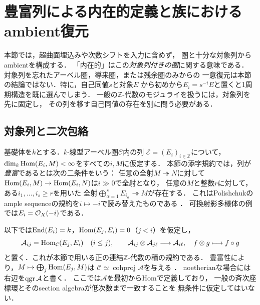 \section{豊富列による内在的定義と族におけるambient復元}
\label{sec:intrinsic-cubic}

本節では，超曲面埋込みや次数シフトを入力に含めず，
圏と十分な対象列からambientを構成する．
「内在的」はこの\emph{対象列付きの圏}に関する意味である．
対象列を忘れたアーベル圏，導来圏，または残余圏のみからの
一意復元は本節の結論ではない．特に，自己同値$s$と対象$E$
から初めから$E_i=s^{-i}E$と置くと1周期構造を既に選んでしまう．
一般の$\mathbb Z$-代数のモジュライを扱うには，対象列を先に固定し，
その列を移す自己同値の存在を別に問う必要がある．

\subsection{対象列と二次包絡}

基礎体を$k$とする．$k$-線型アーベル圏$\mathcal C$内の列
$\mathcal E=(E_i)_{i\in\mathbb Z}$について，
$\dim_k\operatorname{Hom}(E_i,M)<\infty$をすべての$i,M$に仮定する．
本節の添字規約では，列が\emph{豊富}であるとは次の二条件をいう：
任意の全射$M\twoheadrightarrow N$に対して
$\operatorname{Hom}(E_i,M)\to\operatorname{Hom}(E_i,N)$は$i\gg0$で全射となり，
任意の$M$と整数$r$に対して，ある$i_1,\ldots,i_s\geq r$を用いた
全射$\bigoplus_{\alpha=1}^s E_{i_\alpha}\twoheadrightarrow M$が存在する．
これはPolishchukのample sequenceの規約を$i\mapsto-i$で読み替えたものである
\cite[Lemma~2.1, Theorem~2.4]{PolishchukProj}．
可換射影多様体の例では$E_i=\mathcal O_X(-i)$である．

以下では$\operatorname{End}(E_i)=k$，$\operatorname{Hom}(E_j,E_i)=0$（$j<i$）を仮定し，
\begin{equation}\label{eq:intrinsic-section-z}
 \mathcal A_{ij}=\operatorname{Hom}_{\mathcal C}(E_j,E_i)\quad(i\leq j),
 \qquad
 \mathcal A_{ij}\otimes\mathcal A_{j\ell}\longrightarrow\mathcal A_{i\ell},
 \quad f\otimes g\longmapsto f\circ g
\end{equation}
と置く．これが本節で用いる正の連結$\mathbb Z$-代数の積の規約である．
豊富性により，$M\mapsto\bigoplus_j\operatorname{Hom}(E_j,M)$は
$\mathcal C\simeq\operatorname{cohproj}\mathcal A$を与える
\cite[Theorem~2.4]{PolishchukProj}．
noetherianな場合には右辺を$\operatorname{qgr}\mathcal A$と書く．
ここでは$\mathcal A$を最初からHomで定義しており，
一般の斉次座標環とそのsection algebraが低次数まで一致することを
無条件に仮定してはいない．

